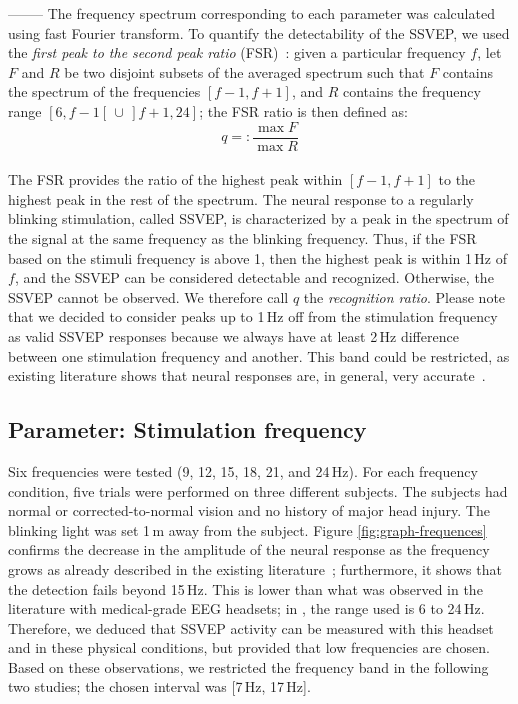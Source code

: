 \documentclass[smallextended]{svjour3}
\begin{document}
--------
\fi
The frequency spectrum corresponding to each parameter was calculated using fast Fourier transform. 
To quantify the detectability of the SSVEP, we used the \textit{first peak to the second peak ratio} (FSR)~\cite{Zheng2010}:
given a particular frequency $f$, let $F$ and $R$ be two disjoint subsets of the averaged spectrum such that $F$ contains the spectrum of the frequencies $[f-1, f+1]$, and $R$ contains the frequency range $[6, f-1[ \,\cup\, ]f+1, 24]$; the FSR ratio is then defined as:
\begin{equation}
\label{recog_rat}
q =:\frac{\max F}{\max R}
\end{equation}
\\
The FSR provides the ratio of the highest peak within $[f-1, f+1]$ to the highest peak in the rest of the spectrum. 
The neural response to a regularly blinking stimulation, called SSVEP, is characterized by a peak in the spectrum of the signal at the same frequency as the blinking frequency. 
Thus, if the FSR based on the stimuli frequency is above 1, then the highest peak is within 1\,Hz of $f$, and the SSVEP can be considered detectable and recognized. 
Otherwise, the SSVEP cannot be observed. 
We therefore call $q$ the \textit{recognition ratio}.
Please note that we decided to consider peaks up to 1\,Hz off from the stimulation frequency as valid SSVEP responses because we always have at least 2\,Hz difference between one stimulation frequency and another. 
This band could be restricted, as existing literature shows that neural responses are, in general, very accurate~\cite{SSVEPfiability}.

\subsection{Parameter: Stimulation frequency}
Six frequencies were tested (9, 12, 15, 18, 21, and 24\,Hz). For each frequency condition, five trials were performed on three different subjects. The subjects had normal or corrected-to-normal vision and no history of major head injury. The blinking light was set 1\,m away from the subject. 
Figure \ref{fig:graph-frequences} confirms the decrease in the amplitude of the neural response as the frequency grows as already described in the existing literature~\cite{herrmann2001}; furthermore, it shows that the detection fails beyond 15\,Hz. 
This is lower than what was observed in the literature with medical-grade EEG headsets; in \cite{SSVEPfiability}, the range used is 6 to 24\,Hz. Therefore, we deduced that SSVEP activity can be measured with this headset and in these physical conditions, but provided that low frequencies are chosen.
Based on these observations, we restricted the frequency band in the following two studies; the chosen interval was [7\,Hz, 17\,Hz].
\end{document}
